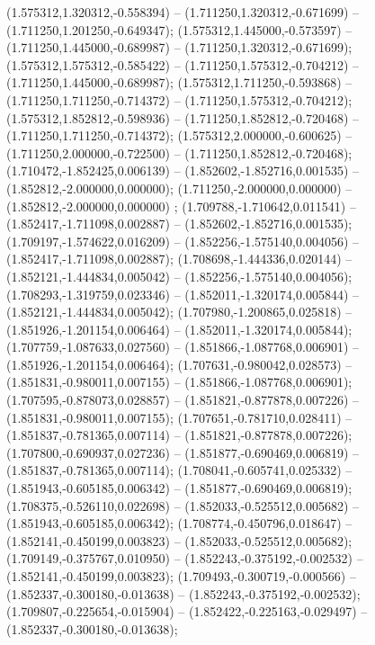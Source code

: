  (1.575312,1.320312,-0.558394) -- (1.711250,1.320312,-0.671699) -- (1.711250,1.201250,-0.649347);
 (1.575312,1.445000,-0.573597) -- (1.711250,1.445000,-0.689987) -- (1.711250,1.320312,-0.671699);
 (1.575312,1.575312,-0.585422) -- (1.711250,1.575312,-0.704212) -- (1.711250,1.445000,-0.689987);
 (1.575312,1.711250,-0.593868) -- (1.711250,1.711250,-0.714372) -- (1.711250,1.575312,-0.704212);
 (1.575312,1.852812,-0.598936) -- (1.711250,1.852812,-0.720468) -- (1.711250,1.711250,-0.714372);
 (1.575312,2.000000,-0.600625) -- (1.711250,2.000000,-0.722500) -- (1.711250,1.852812,-0.720468);
 (1.710472,-1.852425,0.006139) -- (1.852602,-1.852716,0.001535) -- (1.852812,-2.000000,0.000000);
 (1.711250,-2.000000,0.000000) -- (1.852812,-2.000000,0.000000) ;
 (1.709788,-1.710642,0.011541) -- (1.852417,-1.711098,0.002887) -- (1.852602,-1.852716,0.001535);
 (1.709197,-1.574622,0.016209) -- (1.852256,-1.575140,0.004056) -- (1.852417,-1.711098,0.002887);
 (1.708698,-1.444336,0.020144) -- (1.852121,-1.444834,0.005042) -- (1.852256,-1.575140,0.004056);
 (1.708293,-1.319759,0.023346) -- (1.852011,-1.320174,0.005844) -- (1.852121,-1.444834,0.005042);
 (1.707980,-1.200865,0.025818) -- (1.851926,-1.201154,0.006464) -- (1.852011,-1.320174,0.005844);
 (1.707759,-1.087633,0.027560) -- (1.851866,-1.087768,0.006901) -- (1.851926,-1.201154,0.006464);
 (1.707631,-0.980042,0.028573) -- (1.851831,-0.980011,0.007155) -- (1.851866,-1.087768,0.006901);
 (1.707595,-0.878073,0.028857) -- (1.851821,-0.877878,0.007226) -- (1.851831,-0.980011,0.007155);
 (1.707651,-0.781710,0.028411) -- (1.851837,-0.781365,0.007114) -- (1.851821,-0.877878,0.007226);
 (1.707800,-0.690937,0.027236) -- (1.851877,-0.690469,0.006819) -- (1.851837,-0.781365,0.007114);
 (1.708041,-0.605741,0.025332) -- (1.851943,-0.605185,0.006342) -- (1.851877,-0.690469,0.006819);
 (1.708375,-0.526110,0.022698) -- (1.852033,-0.525512,0.005682) -- (1.851943,-0.605185,0.006342);
 (1.708774,-0.450796,0.018647) -- (1.852141,-0.450199,0.003823) -- (1.852033,-0.525512,0.005682);
 (1.709149,-0.375767,0.010950) -- (1.852243,-0.375192,-0.002532) -- (1.852141,-0.450199,0.003823);
 (1.709493,-0.300719,-0.000566) -- (1.852337,-0.300180,-0.013638) -- (1.852243,-0.375192,-0.002532);
 (1.709807,-0.225654,-0.015904) -- (1.852422,-0.225163,-0.029497) -- (1.852337,-0.300180,-0.013638);
